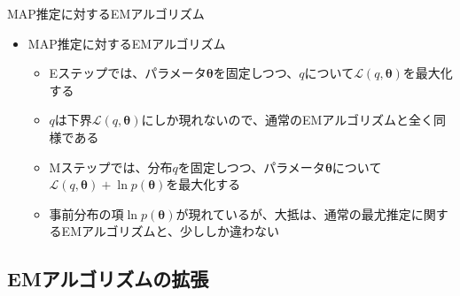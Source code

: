 \documentclass[dvipdfmx,notheorems,t]{beamer}
\begin{document}
\begin{frame}{MAP推定に対するEMアルゴリズム}
\begin{itemize}
\begin{itemize}
		\item $\ln p(\bm{X})$は定数とみなせるから、$\ln p(\bm{\theta} | \bm{X})$の最大化は、結局\color{red}$\mathcal{L}(q, \bm{\theta}) + \ln p(\bm{\theta})$の最大化に相当\normalcolor する
	\end{itemize} \
	
	\framebreak
	
	\item MAP推定に対するEMアルゴリズム
	\begin{itemize}
		\item \alert{Eステップ}では、パラメータ$\bm{\theta}$を固定しつつ、$q$について$\mathcal{L}(q, \bm{\theta})$を最大化する
		\item $q$は下界$\mathcal{L}(q, \bm{\theta})$にしか現れないので、\alert{通常のEMアルゴリズムと全く同様}である
		\newline
		\item \alert{Mステップ}では、分布$q$を固定しつつ、パラメータ$\bm{\theta}$について$\mathcal{L}(q, \bm{\theta}) + \ln p(\bm{\theta})$を最大化する
		\item 事前分布の項$\ln p(\bm{\theta})$が現れているが、大抵は、通常の最尤推定に関するEMアルゴリズムと、少ししか違わない
	\end{itemize}
\end{itemize}

\end{frame}

\subsection{EMアルゴリズムの拡張}
\end{document}
